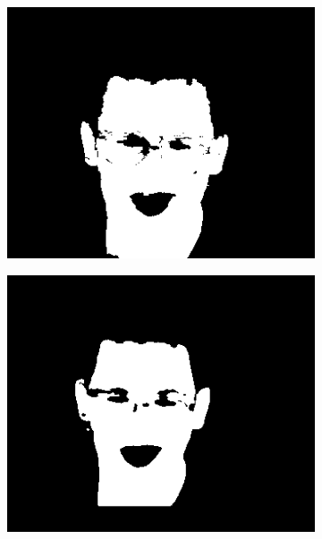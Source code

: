 \begin{figure}[h]
\begin{subfigure}[b]{0.18\textwidth}
         \includegraphics[width=\textwidth]{images/results/base/im00077_y.png}
     \end{subfigure}
    \hfill
     \begin{subfigure}[b]{0.18\textwidth}
         \centering
         \includegraphics[width=\textwidth]{images/results/base/im00077_skinny_1272.png}
     \end{subfigure}
    \hfill
     \begin{subfigure}[b]{0.18\textwidth}
         \centering

\end{subfigure}
\end{figure}
